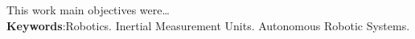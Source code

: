 \begin{resumo}[ABSTRACT]
\begin{SingleSpacing}


    This work main objectives were\ldots\\

\textbf{Keywords}:Robotics. Inertial Measurement Units. Autonomous Robotic Systems.
\end{SingleSpacing}
\end{resumo}
